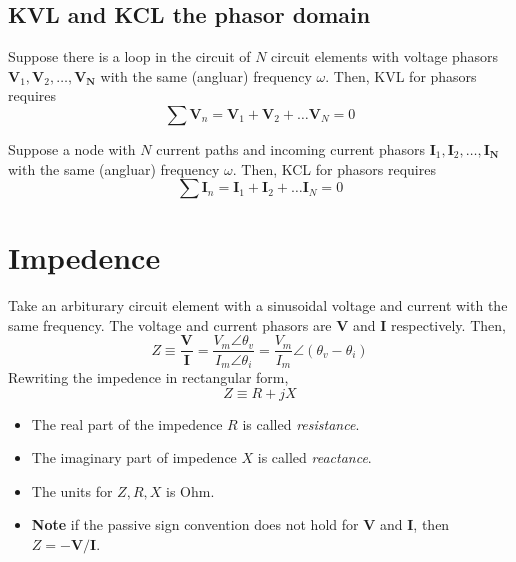 \documentclass{article}
\begin{document}
\subsection{KVL and KCL the phasor domain}
\begin{proposition}
    Suppose there is a loop in the circuit of $N$ circuit elements with voltage phasors $\mathbf V_1,\mathbf V_2,\dots,\mathbf{V_N}$ with the same (angluar) frequency $\omega$. Then, KVL for phasors requires 
    \begin{equation}
        \sum\mathbf V_n=\mathbf V_1+\mathbf V_2+\dots \mathbf V_N=0
    \end{equation}
\end{proposition}
\begin{proposition}
    Suppose a node with $N$ current paths and incoming current phasors $\mathbf I_1,\mathbf I_2,\dots,\mathbf{I_N}$ with the same (angluar) frequency $\omega$. Then, KCL for phasors requires
    \begin{equation}
        \sum \mathbf I_n=\mathbf I_1+\mathbf I_2+\dots \mathbf I_N=0
    \end{equation}
\end{proposition}
\section{Impedence}
\begin{definition}
    Take an arbiturary circuit element with a sinusoidal voltage and current with the same frequency. The voltage and current phasors are $\mathbf V$ and $\mathbf I$ respectively. Then,
    \begin{equation}
        Z\equiv\frac{\mathbf V}{\mathbf I}=\frac{V_m\angle\theta_v}{I_m\angle\theta_i}=\frac{V_m}{I_m}\angle(\theta_v-\theta_i)
    \end{equation}
    Rewriting the impedence in rectangular form, 
    \begin{equation}
        Z\equiv R+jX
    \end{equation}

    \begin{itemize}
        \item The real part of the impedence $R$ is called \textit{resistance}. 
        \item The imaginary part of impedence $X$ is called \textit{reactance}. 
        \item The units for $Z,R,X$ is Ohm.
        \item \textbf{Note} if the passive sign convention does not hold for $\mathbf V$ and $\mathbf I$, then $Z=-\mathbf V/\mathbf I$.
    \end{itemize}
\end{definition}


\end{document}
